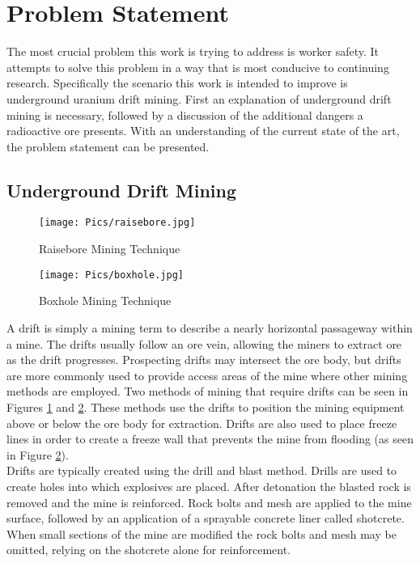 \section{Problem Statement}
\label{sec:prob}
The most crucial problem this work is trying to address is worker safety. It attempts to solve this problem in a way that is most conducive to continuing research. Specifically the scenario this work is intended to improve is underground uranium drift mining. First an explanation of underground drift mining is necessary, followed by a discussion of the additional dangers a radioactive ore presents. With an understanding of the current state of the art, the problem statement can be presented.\\

\subsection{Underground Drift Mining}

\begin{figure}
    \centering
    \texttt{[image: Pics/raisebore.jpg]}
    \caption{Raisebore Mining Technique \cite{weblink}}
    \label{fig:raisebore}
\end{figure}
\begin{figure}
    \centering
    \texttt{[image: Pics/boxhole.jpg]}
    \caption{Boxhole Mining Technique \cite{weblink}}
    \label{fig:boxhole}
\end{figure}
A drift is simply a mining term to describe a nearly horizontal passageway within a mine. The drifts usually follow an ore vein, allowing the miners to extract ore as the drift progresses. Prospecting drifts may intersect the ore body, but drifts are more commonly used to provide access areas of the mine where other mining methods are employed. Two methods of mining that require drifts can be seen in Figures \ref{fig:raisebore} and \ref{fig:boxhole}. These methods use the drifts to position the mining equipment above or below the ore body for extraction. Drifts are also used to place freeze lines in order to create a freeze wall that prevents the mine from flooding (as seen in Figure \ref{fig:boxhole}).\\

Drifts are typically created using the drill and blast method. Drills are used to create holes into which explosives are placed. After detonation the blasted rock is removed and the mine is reinforced. Rock bolts and mesh are applied to the mine surface, followed by an application of a sprayable concrete liner called shotcrete. When small sections of the mine are modified the rock bolts and mesh may be omitted, relying on the shotcrete alone for reinforcement.\\

